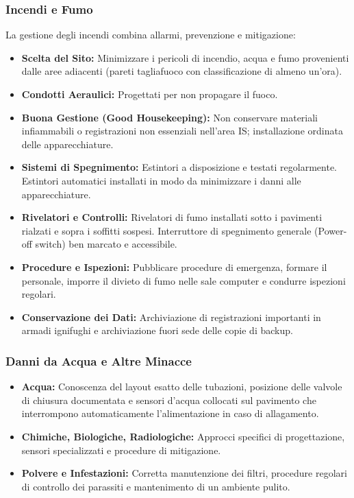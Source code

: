 \subsubsection{Incendi e Fumo}
La gestione degli incendi combina allarmi, prevenzione e mitigazione:
\begin{itemize}
    \item \textbf{Scelta del Sito:} Minimizzare i pericoli di incendio, acqua e fumo provenienti dalle aree adiacenti (pareti tagliafuoco con classificazione di almeno un'ora).
    \item \textbf{Condotti Aeraulici:} Progettati per non propagare il fuoco.
    \item \textbf{Buona Gestione (Good Housekeeping):} Non conservare materiali infiammabili o registrazioni non essenziali nell'area IS; installazione ordinata delle apparecchiature.
    \item \textbf{Sistemi di Spegnimento:} Estintori a disposizione e testati regolarmente. Estintori automatici installati in modo da minimizzare i danni alle apparecchiature.
    \item \textbf{Rivelatori e Controlli:} Rivelatori di fumo installati sotto i pavimenti rialzati e sopra i soffitti sospesi. Interruttore di spegnimento generale (Power-off switch) ben marcato e accessibile.
    \item \textbf{Procedure e Ispezioni:} Pubblicare procedure di emergenza, formare il personale, imporre il divieto di fumo nelle sale computer e condurre ispezioni regolari.
    \item \textbf{Conservazione dei Dati:} Archiviazione di registrazioni importanti in armadi ignifughi e archiviazione fuori sede delle copie di backup.
\end{itemize}

\subsubsection{Danni da Acqua e Altre Minacce}
\begin{itemize}
    \item \textbf{Acqua:} Conoscenza del layout esatto delle tubazioni, posizione delle valvole di chiusura documentata e sensori d'acqua collocati sul pavimento che interrompono automaticamente l'alimentazione in caso di allagamento.
    \item \textbf{Chimiche, Biologiche, Radiologiche:} Approcci specifici di progettazione, sensori specializzati e procedure di mitigazione.
    \item \textbf{Polvere e Infestazioni:} Corretta manutenzione dei filtri, procedure regolari di controllo dei parassiti e mantenimento di un ambiente pulito.
\end{itemize}

